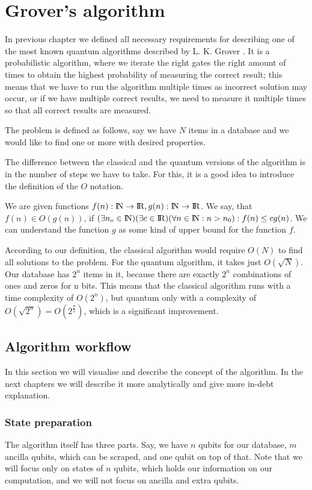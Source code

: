 
\chapter{Grover's algorithm} \label{GA_theo}
In previous chapter we defined all necessary requirements for describing one of the most known quantum algorithms described by L. K. Grover \cite{grover1996fast}. It is a probabilistic algorithm, where we iterate the right gates the right amount of times to obtain the highest probability of measuring the correct result; this means that we have to run the algorithm multiple times as incorrect solution may occur, or if we have multiple correct results, we need to measure it multiple times so that all correct results are measured.

The problem is defined as follows, say we have $N$ items in a database and we would like to find one or more with desired properties. 

The difference between the classical and the quantum versions of the algorithm is in the number of steps we have to take. For this, it is a good idea to introduce the definition of the $O$ notation.

We are given functions $f(n): {\rm I\!N} \rightarrow {\rm I\!R}, g(n): {\rm I\!N} \rightarrow {\rm I\!R}$. 
\newline
We say, that $f(n) \in O(g(n))$, if $ (\exists n_o \in {\rm I\!N})(\exists c \in {\rm I\!R})(\forall n \in {\rm I\!N} : n > n_0) : f(n) \le cg(n)$. We can understand the function $g$ as some kind of upper bound for the function $f$.

According to our definition, the classical algorithm would require $O(N)$ to find all solutions to the problem. For the quantum algorithm, it takes just $O(\sqrt{N})$. Our database has $2^n$ items in it, because there are exactly $2^n$ combinations of ones and zeros for n bits. This means that the classical algorithm runs with a time complexity of $O(2^n)$, but quantum only with a complexity of $O(\sqrt{2^n}) = O(2^{\frac{n}{2}})$, which is a significant improvement.

\section{Algorithm workflow} \label{Algorithm_workflow}
In this section we will visualise and describe the concept of the algorithm. In the next chapters we will describe it more analytically and give more in-debt explanation.
\subsection{State preparation}
The algorithm itself has three parts. Say, we have $n$ qubits for our database, $m$ ancilla qubits, which can be scraped, and one qubit on top of that. Note that we will focus only on states of $n$ qubits, which holds our information on our computation, and we will not focus on ancilla and extra qubits.


